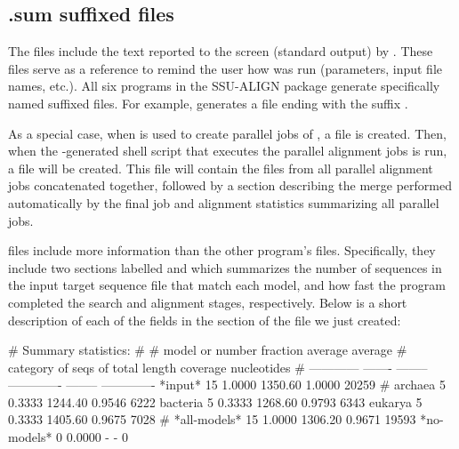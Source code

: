 \subsection{.sum suffixed files}

The  files include the text reported to the screen
(standard output) by . These files serve as a
reference to remind the user how  was run
(parameters, input file names, etc.). All six programs in the
SSU-ALIGN package generate specifically named 
suffixed files. For example,  generates a file ending
with the suffix .

As a special case, when  is used to create parallel
jobs of , a  file is created. Then,
when the -generated shell script that executes the
parallel alignment jobs is run, a  file will be created.
This  file will contain the 
 files from all parallel alignment jobs
concatenated together, followed by a section describing the merge
performed automatically by the final job and alignment
statistics summarizing all parallel jobs.

 files include more information than the other
program's  files. Specifically, they include two sections
labelled  and  which
summarizes the number of sequences in the input target sequence file
that match each model, and how fast the program completed the search
and alignment stages, respectively. Below is a short description of
each of the fields in the  section of the
 file we just created:

\begin{sreoutput}
# Summary statistics:
#
# model or       number  fraction        average   average               
# category      of seqs  of total         length  coverage    nucleotides
# ------------  -------  --------  -------------  --------  -------------
  *input*            15    1.0000        1350.60    1.0000          20259
#
  archaea             5    0.3333        1244.40    0.9546           6222
  bacteria            5    0.3333        1268.60    0.9793           6343
  eukarya             5    0.3333        1405.60    0.9675           7028
#
  *all-models*       15    1.0000        1306.20    0.9671          19593
  *no-models*         0    0.0000              -         -              0
\end{sreoutput}

